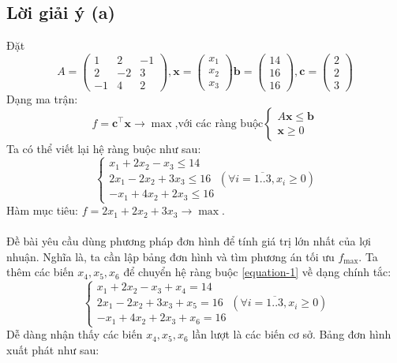 \documentclass[12pt]{article}
\begin{document}
\subsection{Lời giải ý (a)}\label{problem1-solutiona}
Đặt
$$
A = \begin{pmatrix}
1 & 2 & -1 \\
2 & -2 & 3 \\
-1 & 4 & 2
\end{pmatrix},
\mathbf{x} = \begin{pmatrix}
x_1 \\
x_2 \\
x_3
\end{pmatrix}
\mathbf{b} = \begin{pmatrix}
14 \\
16 \\
16
\end{pmatrix},
\mathbf{c} = \begin{pmatrix}
2 \\
2 \\
3
\end{pmatrix}
$$
Dạng ma trận:
$$
f = \mathbf{c}^{\intercal}\mathbf{x} \rightarrow \max
\text{,với các ràng buộc}
\left\{
\begin{aligned}
A\mathbf{x} \leq \mathbf{b} \\
\mathbf{x} \geq 0
\end{aligned}
\right.
$$
Ta có thể viết lại hệ ràng buộc như sau:
\begin{equation}
\label{equation-1}
\left\{ 
\begin{aligned}
x_1 + 2x_2 - x_3 \leq 14 \\
2x_1 - 2x_2 + 3x_3 \leq 16 \\
-x_1 + 4x_2 + 2x_3 \leq 16
\end{aligned}
\right.
(\forall i = \overline{1..3}, x_i \geq 0)
\end{equation}
Hàm mục tiêu: $f = 2x_1 + 2x_2 + 3x_3 \rightarrow \max$.
\\\\
Đề bài yêu cầu dùng phương pháp đơn hình để tính giá trị lớn nhất của lợi nhuận. Nghĩa là, ta cần lập bảng đơn hình và tìm phương án tối ưu $f_{\max}$. Ta thêm các biến $x_4, x_5, x_6$ để chuyển hệ ràng buộc \ref{equation-1} về dạng chính tắc:
\begin{equation}
\label{equation-2}
\left\{ 
\begin{aligned}
x_1 + 2x_2 - x_3 + x_4 = 14 \\
2x_1 - 2x_2 + 3x_3 + x_5 = 16 \\
-x_1 + 4x_2 + 2x_3 + x_6 = 16
\end{aligned}
\right.
(\forall i = \overline{1..3}, x_i \geq 0)
\end{equation}
Dễ dàng nhận thấy các biến $x_4, x_5, x_6$ lần lượt là các biến cơ sở. Bảng đơn hình xuất phát như sau:
\end{document}
